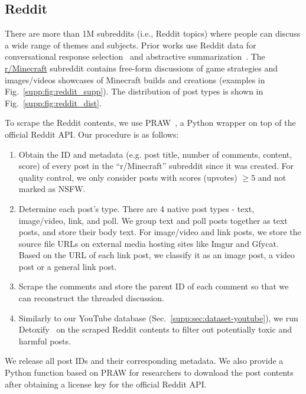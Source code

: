 \subsection{Reddit}
\label{supp:sec:dataset-reddit}


 There are more than 1M subreddits (i.e., Reddit topics) where people can discuss a wide range of themes and subjects. Prior works use Reddit data for conversational response selection~\cite{al-rfou2016conversational, yang-etal-2018-learning, henderson2019repository} and abstractive summarization~\cite{volske-etal-2017-tl, DBLP:conf/naacl/KimKK19}.
 The \href{https://www.reddit.com/r/minecraft}{r/Minecraft} subreddit contains free-form discussions of game strategies and images/videos showcases of Minecraft builds and creations (examples in Fig.~\ref{supp:fig:reddit_supp}).
The distribution of post types is shown in Fig.~\ref{supp:fig:reddit_dist}. 

To scrape the Reddit contents, we use PRAW~\cite{praw}, a Python wrapper on top of the official Reddit API. Our procedure is as follows:

\begin{enumerate}[label=\alph*)]
    \item Obtain the ID and metadata (e.g. post title, number of comments, content, score) of every post in the ``r/Minecraft'' subreddit since it was created. For quality control, we only consider posts with scores (upvotes) $\geq 5$ and not marked as NSFW.
    \item Determine each post's type. There are 4 native post types - text, image/video, link, and poll. We group text and poll posts together as text posts, and store their body text. 
    For image/video and link posts, we store the source file URLs on external media hosting sites like Imgur and Gfycat. Based on the URL of each link post, we classify it as an image post, a video post or a general link post.
    \item Scrape the comments and store the parent ID of each comment so that we can reconstruct the threaded discussion. 
    \item Similarly to our YouTube database (Sec.~\ref{supp:sec:dataset-youtube}), we run  Detoxify~\cite{detoxify} on the scraped Reddit contents to filter out potentially toxic and harmful posts.
\end{enumerate}

We release all post IDs and their corresponding metadata. We also provide a Python function based on PRAW for researchers to download the post contents after obtaining a license key for the official Reddit API.



